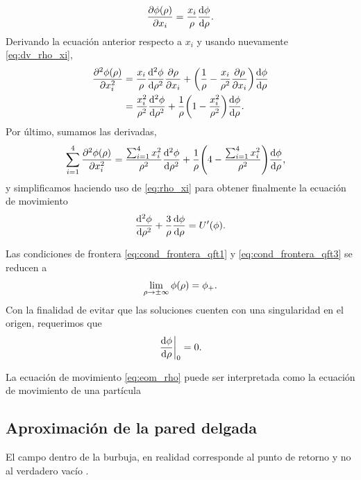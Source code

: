 \begin{equation} \label{eq:dv_phi_rho2}
\pdv{\phi\qty(\rho)}{x_i} = \frac{x_i}{\rho}\dv{\phi}{\rho}.
\end{equation}
Derivando la ecuación anterior
respecto a $x_i$ y usando nuevamente \eqref{eq:dv_rho_xi},
\begin{align}
	\pdv[2]{\phi\qty(\rho)}{x_i} &= \frac{x_i}{\rho}\dv[2]{\phi}{\rho}\pdv{\rho}{x_i} + \qty(\frac{1}{\rho} - \frac{x_i}{\rho^2}\pdv{\rho}{x_i})\dv{\phi}{\rho} \\
	&= \frac{x_i^2}{\rho^2}\dv[2]{\phi}{\rho} + \frac{1}{\rho}\qty(1 - \frac{x_i^2}{\rho^2})\dv{\phi}{\rho}. 
\end{align}
Por último, sumamos las derivadas,
\begin{align}
\sum_{i = 1}^{4} \pdv[2]{\phi\qty(\rho)}{x_i} &=  \frac{\sum_{i = 1}^{4} x_i^2}{\rho^2}\dv[2]{\phi}{\rho} + \frac{1}{\rho}\qty(4 - \frac{\sum_{i = 1}^{4} x_i^2}{\rho^2})\dv{\phi}{\rho}, 
\end{align}
y simplificamos haciendo uso de \eqref{eq:rho_xi} para obtener finalmente la ecuación de movimiento 
\begin{equation} \label{eq:eom_rho}
	\dv[2]{\phi}{\rho} + \frac{3}{\rho}\dv{\phi}{\rho} = U'\qty(\phi).
\end{equation}

Las condiciones de frontera \eqref{eq:cond_frontera_qft1} y \eqref{eq:cond_frontera_qft3} se reducen a 
\begin{equation} \label{eq:cond_frontera_rho1}
\lim_{\rho \rightarrow \pm\infty} \phi\qty(\rho) = \phi_+.
\end{equation}
Con la finalidad de evitar que las soluciones cuenten con una singularidad en el origen, requerimos que \cite{coleman1977fate}
\begin{equation}
	\eval{\dv{\phi}{\rho}}_0 = 0.
\end{equation}

La ecuación de movimiento \eqref{eq:eom_rho} puede ser interpretada como la ecuación de movimiento de una partícula 


\subsection{Aproximación de la pared delgada}

El campo dentro de la burbuja, en realidad corresponde al punto de retorno y no al verdadero vacío \cite{lee2005fate}. 

